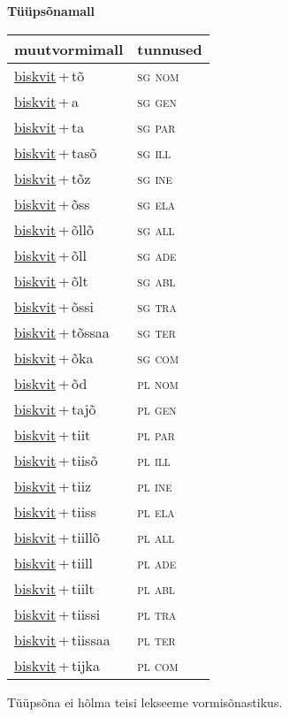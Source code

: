 
\vspace{1.8em}
\begin{minipage}{\textwidth}
\textbf{Tüüpsõnamall \,}\\

\begin{sideways}
\begin{tabular}{l l}
muutvormimall & tunnused \\
\hline
\underline{biskvit}\,+\,tõ & \textsc{ sg nom } \\
\underline{biskvit}\,+\,a & \textsc{ sg gen } \\
\underline{biskvit}\,+\,ta & \textsc{ sg par } \\
\underline{biskvit}\,+\,tasõ & \textsc{ sg ill } \\
\underline{biskvit}\,+\,tõz & \textsc{ sg ine } \\
\underline{biskvit}\,+\,õss & \textsc{ sg ela } \\
\underline{biskvit}\,+\,õllõ & \textsc{ sg all } \\
\underline{biskvit}\,+\,õll & \textsc{ sg ade } \\
\underline{biskvit}\,+\,õlt & \textsc{ sg abl } \\
\underline{biskvit}\,+\,õssi & \textsc{ sg tra } \\
\underline{biskvit}\,+\,tõssaa & \textsc{ sg ter } \\
\underline{biskvit}\,+\,õka & \textsc{ sg com } \\
\underline{biskvit}\,+\,õd & \textsc{ pl nom } \\
\underline{biskvit}\,+\,tajõ & \textsc{ pl gen } \\
\underline{biskvit}\,+\,tiit & \textsc{ pl par } \\
\underline{biskvit}\,+\,tiisõ & \textsc{ pl ill } \\
\underline{biskvit}\,+\,tiiz & \textsc{ pl ine } \\
\underline{biskvit}\,+\,tiiss & \textsc{ pl ela } \\
\underline{biskvit}\,+\,tiillõ & \textsc{ pl all } \\
\underline{biskvit}\,+\,tiill & \textsc{ pl ade } \\
\underline{biskvit}\,+\,tiilt & \textsc{ pl abl } \\
\underline{biskvit}\,+\,tiissi & \textsc{ pl tra } \\
\underline{biskvit}\,+\,tiissaa & \textsc{ pl ter } \\
\underline{biskvit}\,+\,tijka & \textsc{ pl com } \\
\end{tabular}
\end{sideways}
\label{tab:tüüpsõnamall-biskvittõ}

\end{minipage}

 
\vspace{1em}
\noindent Tüüpsõna ei hõlma teisi lekseeme vormi\-sõnastikus.
